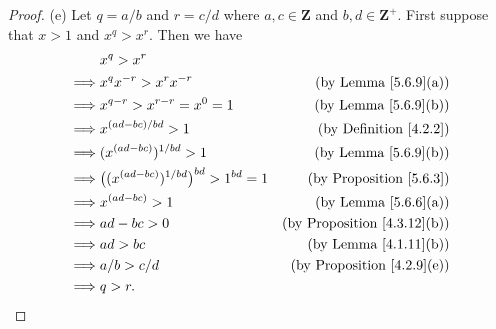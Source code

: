 \begin{proof}{(e)}
    Let \(q = a / b\) and \(r = c / d\) where \(a, c \in \mathbf{Z}\) and \(b, d \in \mathbf{Z}^+\).
    First suppose that \(x > 1\) and \(x^q > x^r\).
    Then we have
    \begin{align*}
                 & x^q > x^r                                                                                      \\
        \implies & x^q x^{-r} > x^r x^{-r}                              & \text{(by Lemma \ref{5.6.9}(a))}        \\
        \implies & x^{q - r} > x^{r - r} = x^0 = 1                      & \text{(by Lemma \ref{5.6.9}(b))}        \\
        \implies & x^{(ad - bc) / bd} > 1                               & \text{(by Definition \ref{4.2.2})}      \\
        \implies & (x^{(ad - bc)})^{1 / bd} > 1                         & \text{(by Lemma \ref{5.6.9}(b))}        \\
        \implies & \big((x^{(ad - bc)})^{1 / bd}\big)^{bd} > 1^{bd} = 1 & \text{(by Proposition \ref{5.6.3})}     \\
        \implies & x^{(ad - bc)} > 1                                    & \text{(by Lemma \ref{5.6.6}(a))}        \\
        \implies & ad - bc > 0                                          & \text{(by Proposition \ref{4.3.12}(b))} \\
        \implies & ad > bc                                              & \text{(by Lemma \ref{4.1.11}(b))}       \\
        \implies & a / b > c / d                                        & \text{(by Proposition \ref{4.2.9}(e))}  \\
        \implies & q > r.
    \end{align*}


\end{proof}
